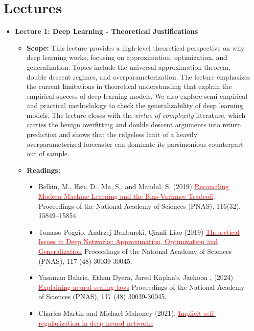 \documentclass[11pt]{article}
\begin{document}
\section*{Lectures}

\begin{itemize}

\item \textbf{Lecture 1: Deep Learning - Theoretical Justifications}
  \begin{itemize}
    \item \textbf{Scope:} This lecture provides a high-level theoretical perspective on
      why deep learning works, focusing on approximation, optimization, and
      generalization. Topics include the universal approximation theorem, double
      descent regimes, and overparameterization. The lecture emphasizes the current
      limitations in theoretical understanding that explain the empirical success of
      deep learning models. We also explore semi-empirical and practical methodology
      to check the generalizability of deep learning models. The lecture closes with
      the \textit{virtue of complexity} literature, which carries the benign
      overfitting and double descent arguments into return prediction and shows that
      the ridgeless limit of a heavily overparameterized forecaster can dominate its
      parsimonious counterpart out of sample.
    \item \textbf{Readings:}
      \begin{itemize}
        \item Belkin, M., Hsu, D., Ma, S., and Mandal, S. (2019) \href{https://arxiv.org/pdf/1812.11118}{\textcolor{red}{Reconciling Modern Machine Learning and the Bias-Variance Tradeoff}}. Proceedings of the National Academy of Sciences (PNAS), 116(32), 15849--15854.
        \item Tomaso Poggio, Andrzej Banburski, Qianli Liao (2019) \href{https://arxiv.org/pdf/1908.09375}{\textcolor{red}{Theoretical Issues in Deep Networks: Approximation, Optimization and Generalization}} Proceedings of the National Academy of Sciences (PNAS), 117 (48) 30039-30045.
        \item Yasaman Bahria, Ethan Dyera, Jared Kaplanb, Jaehoon , (2024) \href{https://www.pnas.org/doi/epub/10.1073/pnas.2311878121}{\textcolor{red}{Explaining neural scaling laws}} Proceedings of the National Academy of Sciences (PNAS), 117 (48) 30039-30045.
        \item Charles Martin and Michael Mahoney (2021), \href{https://arxiv.org/pdf/1810.01075}{\textcolor{red}{Implicit self-regularization in deep neural networks}}

\end{itemize}
\end{itemize}
\end{itemize}
\end{document}
